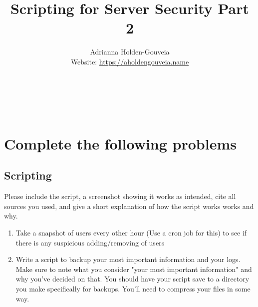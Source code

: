 \documentclass[12pt]{article}
\title{Scripting for Server Security Part 2}
\author{
        Adrianna Holden-Gouveia \\
        Website: \url{https://aholdengouveia.name}\\ 
        \date{\vspace{-5ex}}
        \faLinkedin{: aholdengouveia} \\
        \faGithub {: aholdengouveia} \\
        \faTwitter {: aholdengouveia} \\
        }
\begin{document}
    

\maketitle


\section*{Complete the following problems}

\subsection*{Scripting}

Please include the script, a screenshot showing it works as intended, cite all sources you used, and give a short explanation of how the script works works and why.

    \begin{enumerate}
        \item Take a snapshot of users every other hour (Use a cron job for this) to see if there is any suspicious adding/removing of users 
        \item Write a script to backup your most important information and your logs.  Make sure to note what you consider "your most important information" and why you've decided on that.  You should have your script save to a directory you make specifically for backups.  You'll need to compress your files in some way.
    \end{enumerate}    
\end{document}
